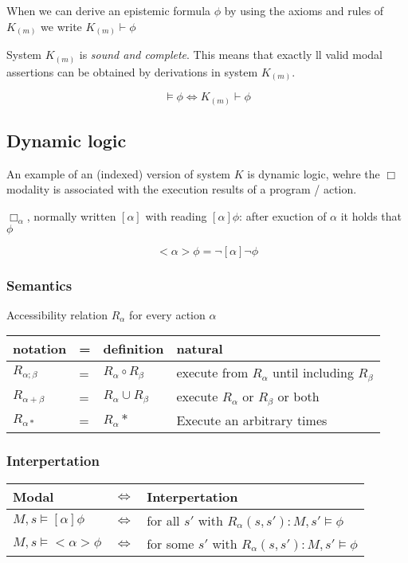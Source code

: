 \documentclass{article}
\begin{document}
When we can derive an epistemic formula $\phi$ by using the axioms
and rules of $K_{(m)}$ we write $K_{(m)} \vdash \phi$

System $K_{(m)}$ is \emph{sound and complete}. This means
that exactly ll valid modal assertions can be obtained by derivations in
system $K_{(m)}$.

\[\vDash \phi \Leftrightarrow K_{(m)} \vdash \phi\]


\subsection{Dynamic logic}
An example of an (indexed) version of system $K$ is dynamic logic,
wehre the $\Box$ modality is associated with the execution results of
a program / action.

$\Box_\alpha$, normally written $[\alpha]$ 
with reading $[\alpha]\phi$: after exuction of $\alpha$ it holds that $\phi$

\[<\alpha>\phi = \neg [\alpha] \neg \phi \]

\subsubsection{Semantics}
Accessibility relation $R_\alpha$ for every action $\alpha$

\begin{tabular}{llll}
	notation & = & definition & natural \\ \toprule
	$R_{\alpha;\beta}$ & = & $R_\alpha \circ R_\beta$ &
	execute from $R_\alpha$ until including $R_\beta$\\
	$R_{\alpha+\beta}$ & = & $R_\alpha \cup R_\beta$ &
	execute $R_\alpha$ or $R_\beta$ or both\\
	$R_{\alpha*}$ & = & $R_\alpha*$ &
	Execute an arbitrary times \\ \bottomrule
\end{tabular}

\subsubsection{Interpertation}
\begin{tabular}{lll}
	Modal & $\Leftrightarrow$ & Interpertation \\ \toprule
	$M,s \vDash [\alpha]\phi$ & $\Leftrightarrow$ &
	for all $s'$ with $R_\alpha(s,s'): M,s' \vDash \phi$ \\
	$M,s \vDash <\alpha>\phi$ & $\Leftrightarrow$ &
	for some $s'$ with $R_\alpha(s,s'): M,s' \vDash \phi$ \\\bottomrule
\end{tabular}
\end{document}
